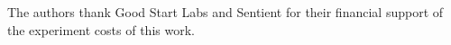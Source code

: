 The authors thank Good Start Labs and Sentient for their financial support of the experiment costs of this work.
